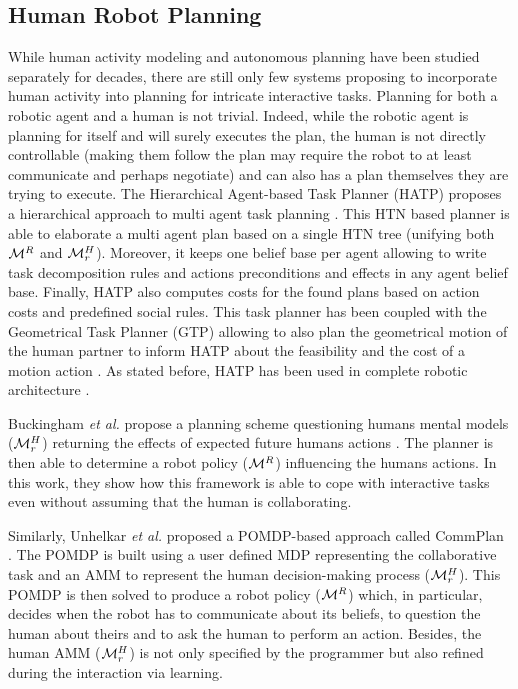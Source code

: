 \documentclass[a4paper,11pt,twoside]{StyleThese}
\begin{document}
\subsection{Human Robot Planning}
While human activity modeling and autonomous planning have been studied separately for decades, there are still only few systems proposing to incorporate human activity into planning for intricate interactive tasks.
Planning for both a robotic agent and a human is not trivial. Indeed, while the robotic agent is planning for itself and will surely executes the plan, the human is not directly controllable (making them follow the plan may require the robot to at least communicate and perhaps negotiate) and can also has a plan themselves they are trying to execute.
The Hierarchical Agent-based Task Planner (HATP) proposes a hierarchical approach to multi agent task planning \cite{alili2009task, lallement2014hatp}. This HTN based planner is able to elaborate a multi agent plan based on a single HTN tree (unifying both $\mathcal{M}^R$ and $\mathcal{M}^H_r$). Moreover, it keeps one belief base per agent allowing to write task decomposition rules and actions preconditions and effects in any agent belief base. Finally, HATP also computes costs for the found plans based on action costs and predefined social rules. This task planner has been coupled with the Geometrical Task Planner (GTP) allowing to also plan the geometrical motion of the human partner to inform HATP about the feasibility and the cost of a motion action \cite{gharbi2015combining}. As stated before, HATP has been used in complete robotic architecture \cite{devin2016implemented, lemaignan2017artificial}.

Buckingham \textit{et al.} propose a planning scheme questioning humans mental models ($\mathcal{M}^H_r$) returning the effects of expected future humans actions \cite{buckingham2020robot}. The planner is then able to determine a robot policy ($\mathcal{M}^R$) influencing the humans actions. In this work, they show how this framework is able to cope with interactive tasks even without assuming that the human is collaborating.

Similarly, Unhelkar \textit{et al.} proposed a POMDP-based approach called CommPlan \cite{unhelkar2020decision}. The POMDP is built using a user defined MDP representing the collaborative task and an AMM to represent the human decision-making process ($\mathcal{M}^H_r$). This POMDP is then solved to produce a robot policy ($\mathcal{M}^R$) which, in particular, decides when the robot has to communicate about its beliefs, to question the human about theirs and to ask the human to perform an action. Besides, the human AMM ($\mathcal{M}^H_r$) is not only specified by the programmer but also refined during the interaction via learning. 
\end{document}

